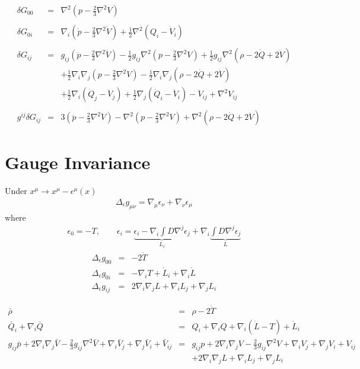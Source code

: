 \documentclass[10pt,letterpaper]{article}
\numberwithin{equation}{section}
\begin{document}
\begin{eqnarray}
\delta G_{00} &=& \nabla^2 ( p -\tfrac23 \nabla^2 V)
\nonumber\\ \nonumber\\
\delta G_{0i} &=& \nabla_i (\dot p -\tfrac23 \nabla^2 \dot V) + \tfrac12 \nabla^2 (Q_i - \dot V_i)
\nonumber\\ \nonumber\\
\delta G_{ij} &=& g_{ij}( \ddot p - \tfrac23 \nabla^2 \ddot V) - \tfrac12 g_{ij} \nabla^2 (p-\tfrac23 \nabla^2 V) +
\tfrac12 g_{ij}\nabla^2( \rho - 2\dot Q + 2\ddot V)
\nonumber\\
&& + \tfrac12 \nabla_i\nabla_j (p-\tfrac23 \nabla^2 V) -\tfrac12 \nabla_i\nabla_j (\rho-2\dot Q+2\ddot V)
\nonumber\\
&&+ \tfrac12 \nabla_i (\dot Q_j -\ddot V_j) + \tfrac12 \nabla_j (\dot Q_i - \ddot V_i) - \ddot V_{ij} + \nabla^2 V_{ij}
\nonumber\\ \nonumber\\
g^{ij}\delta G_{ij} &=& 3(\ddot p - \tfrac23 \nabla^2 \ddot V) - \nabla^2 (p-\tfrac23 \nabla^2 V) + \nabla^2 (\rho-2\dot Q+2\ddot V)
\end{eqnarray}


\section{Gauge Invariance}
Under $x^\mu \to x^\mu - \epsilon^\mu(x)$
\begin{eqnarray}
\Delta_\epsilon g_{\mu\nu} = \nabla_\mu \epsilon_\nu + \nabla_\nu \epsilon_\mu
\end{eqnarray}
where
\begin{eqnarray}
\epsilon_0 = -T,\qquad \epsilon_i = \underbrace{ \epsilon_i - \nabla_i \int D \nabla^j \epsilon_j}_{L_i} + 
\nabla_i \underbrace{ \int D \nabla^j \epsilon_j}_{L} 
\end{eqnarray}
\begin{eqnarray}
\Delta_\epsilon g_{00} &=& -2\dot T
\nonumber\\
\Delta_\epsilon g_{0i} &=& -\nabla_i T + \dot L_i + \nabla_i \dot L
\nonumber\\
\Delta_\epsilon g_{ij} &=& 2\nabla_i\nabla_j L + \nabla_i L_j + \nabla_j L_i 
\end{eqnarray}

\begin{eqnarray}
\bar\rho &=& \rho - 2\dot T
\nonumber\\
\bar Q_i +\nabla_i \bar Q &=& Q_i + \nabla_i Q + \nabla_i (\dot L-T) + \dot L_i
\nonumber\\
 g_{ij}\bar p + 2\nabla_i \nabla_j \bar V -\tfrac23 g_{ij}\nabla^2 \bar V + \nabla_i\bar V_j+
\nabla_j \bar V_i + \bar V_{ij} &=&  g_{ij} p + 2\nabla_i \nabla_j V -\tfrac23 g_{ij}\nabla^2 V + \nabla_i V_j + 
\nabla_j  V_i +  V_{ij}
\nonumber\\
&& +  2\nabla_i\nabla_j L + \nabla_i L_j + \nabla_j L_i 
\end{eqnarray}
\end{document}
